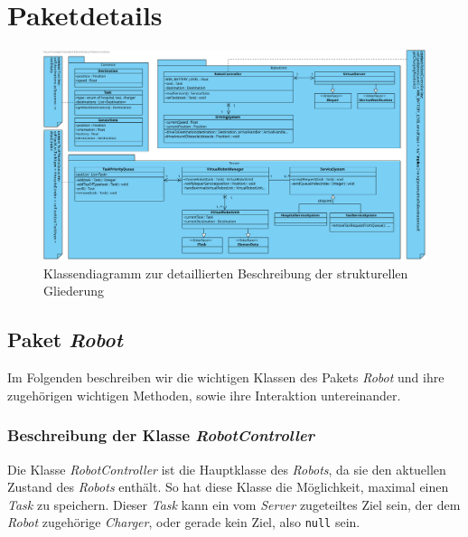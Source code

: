 \section{Paketdetails}
\begin{figure}[H]
\centering
\includegraphics[height=0.80\linewidth, angle=90]{img/7-paketdetails}
\caption{Klassendiagramm zur detaillierten Beschreibung der strukturellen Gliederung}
\label{Paketdetails}
\end{figure}

\subsection{Paket \textit{Robot}}
	Im Folgenden beschreiben wir die wichtigen Klassen des Pakets \textit{Robot} 
	und ihre zugehörigen wichtigen Methoden, sowie ihre Interaktion untereinander. 


	\subsubsection{Beschreibung der Klasse \textit{RobotController}}
		
		Die Klasse \textit{RobotController} ist die Hauptklasse des \textit{Robots}, 
		da sie den aktuellen Zustand des \textit{Robots} enthält.
		So hat diese Klasse die Möglichkeit, maximal einen \textit{Task} zu speichern. 
		Dieser \textit{Task} kann ein vom \textit{Server} zugeteiltes Ziel sein, 
		der dem \textit{Robot} zugehörige \textit{Charger}, oder gerade kein Ziel, 
		also \texttt{null} sein. 


